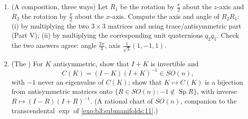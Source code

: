 \begin{problem}
\begin{enumerate}[resume]
  \item (A composition, three ways) Let $R_1$ be the rotation
        by $\frac\pi2$ about the $z$-axis and $R_2$ the
        rotation by $\frac\pi2$ about the $x$-axis. Compute
        the axis and angle of $R_2R_1$: (i) by multiplying
        the two $3\times3$ matrices and using
        trace/antisymmetric part (Part V); (ii) by
        multiplying the corresponding unit quaternions
        $q_2q_1$. Check the two answers agree: angle
        $\frac{2\pi}3$, axis $\frac1{\sqrt3}(1, -1, 1)$.
  \item (The ) For $K$ antisymmetric, show
        that $I + K$ is invertible and
        \[
        C(K) = (I - K)(I + K)^{-1} \in SO(n),
        \]
        with $-1$ never an eigenvalue of $C(K)$; show that
        $K \mapsto C(K)$ is a bijection from antisymmetric
        matrices onto $\{R \in SO(n) : -1 \notin
        \operatorname{Sp}R\}$, with inverse $R \mapsto (I -
        R)(I + R)^{-1}$. (A rational chart of $SO(n)$,
        companion to the transcendental $\exp$ of
        \cref{exo:b3:submanifolds:11}.)
\end{enumerate}
\end{problem}
